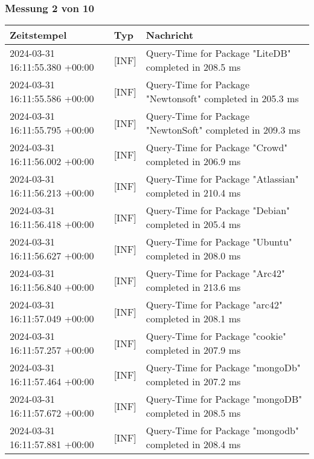     \subsubsection{Messung 2 von 10} \label{subsubsec:MySQLOhneIndex2von10}
        {
            {\small
                \begin{tabularx}{\textwidth}{|l|l|X|}
                    \hline
                    \textbf{Zeitstempel} & \textbf{Typ} & \textbf{Nachricht} \\
                    \hline
                    \endhead
                    2024-03-31 16:11:55.380 +00:00 & [INF] & Query-Time for Package "LiteDB" completed in 208.5 ms \\
                    2024-03-31 16:11:55.586 +00:00 & [INF] & Query-Time for Package "Newtonsoft" completed in 205.3 ms \\
                    2024-03-31 16:11:55.795 +00:00 & [INF] & Query-Time for Package "NewtonSoft" completed in 209.3 ms \\
                    2024-03-31 16:11:56.002 +00:00 & [INF] & Query-Time for Package "Crowd" completed in 206.9 ms \\
                    2024-03-31 16:11:56.213 +00:00 & [INF] & Query-Time for Package "Atlassian" completed in 210.4 ms \\
                    2024-03-31 16:11:56.418 +00:00 & [INF] & Query-Time for Package "Debian" completed in 205.4 ms \\
                    2024-03-31 16:11:56.627 +00:00 & [INF] & Query-Time for Package "Ubuntu" completed in 208.0 ms \\
                    2024-03-31 16:11:56.840 +00:00 & [INF] & Query-Time for Package "Arc42" completed in 213.6 ms \\
                    2024-03-31 16:11:57.049 +00:00 & [INF] & Query-Time for Package "arc42" completed in 208.1 ms \\
                    2024-03-31 16:11:57.257 +00:00 & [INF] & Query-Time for Package "cookie" completed in 207.9 ms \\
                    2024-03-31 16:11:57.464 +00:00 & [INF] & Query-Time for Package "mongoDb" completed in 207.2 ms \\
                    2024-03-31 16:11:57.672 +00:00 & [INF] & Query-Time for Package "mongoDB" completed in 208.5 ms \\
                    2024-03-31 16:11:57.881 +00:00 & [INF] & Query-Time for Package "mongodb" completed in 208.4 ms \\

\end{tabularx}}}
